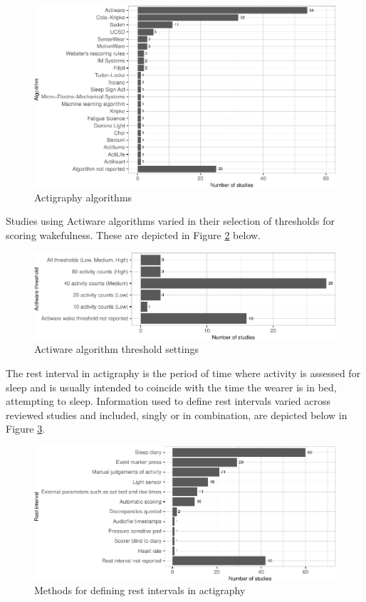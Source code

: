 \documentclass[
]{article}
\begin{document}
\begin{figure}
\centering
\includegraphics{review_markdown_files/figure-latex/algorithms-1.pdf}
\caption{\label{fig:algorithms}Actigraphy algorithms}
\end{figure}

Studies using Actiware algorithms varied in their selection of thresholds for scoring wakefulness. These are depicted in Figure \ref{fig:actiware} below.

\begin{figure}
\centering
\includegraphics{review_markdown_files/figure-latex/actiware-1.pdf}
\caption{\label{fig:actiware}Actiware algorithm threshold settings}
\end{figure}

The rest interval in actigraphy is the period of time where activity is assessed for sleep and is usually intended to coincide with the time the wearer is in bed, attempting to sleep. Information used to define rest intervals varied across reviewed studies and included, singly or in combination, are depicted below in Figure \ref{fig:intervals}.

\begin{figure}
\centering
\includegraphics{review_markdown_files/figure-latex/intervals-1.pdf}
\caption{\label{fig:intervals}Methods for defining rest intervals in actigraphy}
\end{figure}
\end{document}

